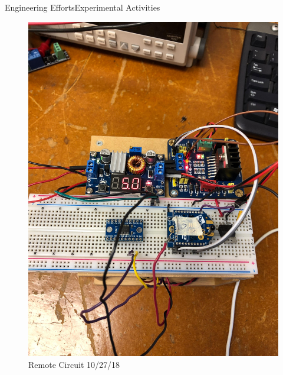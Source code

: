 \documentclass{beamer}
\begin{document}
\begin{frame}{Engineering Efforts}{Experimental Activities}
     \begin{figure}
     \centering
     \includegraphics[scale=.04]{figs/img/Circuit1027.jpg}
     \caption{Remote Circuit 10/27/18}
     \label{fig:RemoteCircuit10/27}
    \end{figure}
\end{frame}
\end{document}

